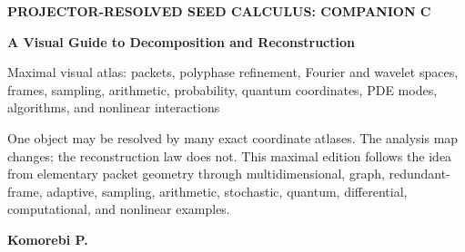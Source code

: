 \documentclass[10pt]{article}
\begin{document}
\begin{titlepage}
\thispagestyle{empty}
\vspace*{0.52in}
{\fontsize{13}{15}\selectfont\color{Blue}\bfseries PROJECTOR-RESOLVED SEED CALCULUS: COMPANION C\par}
\vspace{0.18in}
{\fontsize{34}{38}\selectfont\bfseries A Visual Guide to Decomposition and Reconstruction\par}
\vspace{0.18in}
{\fontsize{18}{22}\selectfont\color{Muted} Maximal visual atlas: packets, polyphase refinement, Fourier and wavelet spaces, frames, sampling, arithmetic, probability, quantum coordinates, PDE modes, algorithms, and nonlinear interactions\par}
\vspace{0.45in}
\begin{minipage}{0.70\linewidth}
\large
One object may be resolved by many exact coordinate atlases. The analysis map changes; the reconstruction law does not. This maximal edition follows the idea from elementary packet geometry through multidimensional, graph, redundant-frame, adaptive, sampling, arithmetic, stochastic, quantum, differential, computational, and nonlinear examples.
\end{minipage}
\vfill
{\fontsize{18}{21}\selectfont\bfseries Komorebi P.\par}
\vspace{0.32in}
\end{titlepage}
\end{document}
